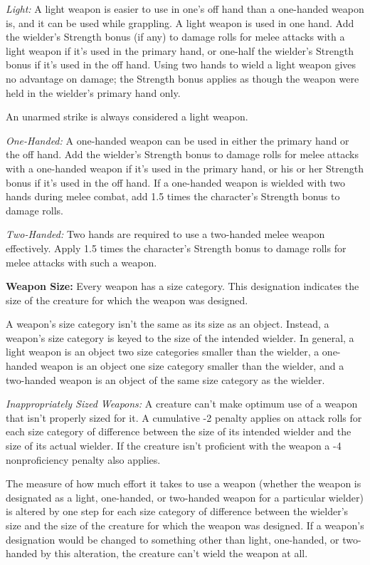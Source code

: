 \textit{Light:} A light weapon is easier to use in one's off hand than a one-handed 
weapon is, and it can be used while grappling. A light weapon is used in one hand. 
Add the wielder's Strength bonus (if any) to damage rolls for melee attacks with 
a light weapon if it's used in the primary hand, or one-half the wielder's Strength 
bonus if it's used in the off hand. Using two hands to wield a light weapon gives 
no advantage on damage; the Strength bonus applies as though the weapon were held 
in the wielder's primary hand only.

An unarmed strike is always considered a light weapon.

\textit{One-Handed:} A one-handed weapon can be used in either the primary hand 
or the off hand. Add the wielder's Strength bonus to damage rolls for melee attacks 
with a one-handed weapon if it's used in the primary hand, or  his or her Strength 
bonus if it's used in the off hand. If a one-handed weapon is wielded with two 
hands during melee combat, add 1.5 times the character's Strength bonus to damage 
rolls.

\textit{Two-Handed:} Two hands are required to use a two-handed melee weapon effectively. 
Apply 1.5 times the character's Strength bonus to damage rolls for melee attacks 
with such a weapon. 

\vspace{12pt}
\textbf{Weapon Size:} Every weapon has a size category. This designation indicates 
the size of the creature for which the weapon was designed.

A weapon's size category isn't the same as its size as an object. Instead, a weapon's 
size category is keyed to the size of the intended wielder. In general, a light 
weapon is an object two size categories smaller than the wielder, a one-handed 
weapon is an object one size category smaller than the wielder, and a two-handed 
weapon is an object of the same size category as the wielder.

\textit{Inappropriately Sized Weapons:} A creature can't make optimum use of a 
weapon that isn't properly sized for it. A cumulative -2 penalty applies on attack 
rolls for each size category of difference between the size of its intended wielder 
and the size of its actual wielder. If the creature isn't proficient with the weapon 
a -4 nonproficiency penalty also applies.

The measure of how much effort it takes to use a weapon (whether the weapon is 
designated as a light, one-handed, or two-handed weapon for a particular wielder) 
is altered by one step for each size category of difference between the wielder's 
size and the size of the creature for which the weapon was designed. If a weapon's 
designation would be changed to something other than light, one-handed, or two-handed 
by this alteration, the creature can't wield the weapon at all.

